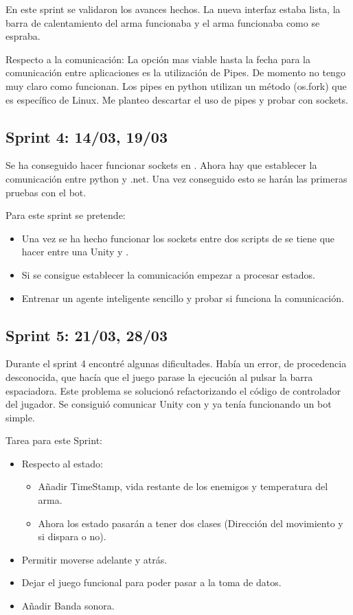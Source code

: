 En este sprint se validaron los avances hechos. La nueva interfaz estaba lista, la barra de calentamiento del arma funcionaba y el arma funcionaba como se espraba.

Respecto a la comunicación:
La opción mas viable hasta la fecha para la comunicación entre aplicaciones es la utilización de Pipes. De momento no tengo muy claro como funcionan. Los pipes en python utilizan un método (os.fork) que es específico de Linux. Me planteo descartar el uso de pipes y probar con sockets.


\subsection{Sprint 4:  14/03, 19/03}

Se ha conseguido hacer funcionar sockets en . Ahora hay que establecer la comunicación entre python y .net. Una vez conseguido esto se harán las primeras pruebas con el bot.

Para este sprint se pretende:
\begin{itemize}
    \item Una vez se ha hecho funcionar los sockets entre dos scripts de  se tiene que hacer entre una Unity y .
    \item Si se consigue establecer la comunicación empezar a procesar estados.
    \item Entrenar un agente inteligente sencillo y probar si funciona la comunicación.
\end{itemize}



\subsection{Sprint 5:  21/03, 28/03}

Durante el sprint 4 encontré algunas dificultades. Había un error, de procedencia desconocida, que hacía que el juego parase la ejecución al pulsar la barra espaciadora. Este problema se solucionó refactorizando el código de controlador del jugador. Se consiguió comunicar Unity con  y ya tenía funcionando un bot simple.

Tarea para este Sprint: 
\begin{itemize}
    \item Respecto al estado:
    \begin{itemize}
        \item Añadir TimeStamp, vida restante de los enemigos y temperatura del arma.
        \item Ahora los estado pasarán a tener dos clases (Dirección del movimiento y si dispara o no).
    \end{itemize}
    \item Permitir moverse adelante y atrás.
    \item Dejar el juego funcional para poder pasar a la toma de datos.
    \item Añadir Banda sonora.
\end{itemize}



